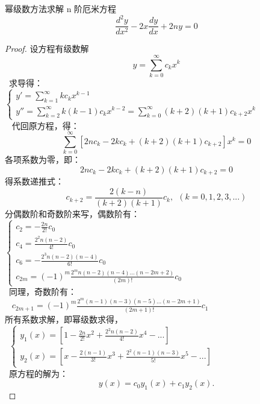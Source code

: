 \begin{example} %
	幂级数方法求解 n 阶厄米方程
	\begin{equation*}
		\frac{d^2 y}{d x^2} -2x \frac{d y}{d x} +2n y =0 
	\end{equation*}     
	
	\begin{proof} 
	设方程有级数解
		\begin{equation*}
		y=\sum_{k=0}^{\infty} c_k x^k
		\end{equation*}     
	 求导得：\\
	$\begin{cases}
	 y' = \sum_{k=1}^{\infty} k c_k x^{k-1} \\
	 y'' = \sum_{k=2}^{\infty} k (k-1) c_k x^{k-2} =  \sum_{k=0}^{\infty} (k+2) (k+1) c_{k+2} x^k
	 \end{cases}$ \\
    代回原方程，得：
   	\begin{equation*}
    \sum_{k=0}^{\infty} [ 2nc_k -2kc_k +(k+2)(k+1) c_{k+2}  ] x^k  =0
    \end{equation*}   
    各项系数为零，即： 
     \begin{equation*}
    2nc_k -2kc_k +(k+2)(k+1) c_{k+2} =0
    \end{equation*}   
    得系数递推式：
    \begin{equation*}
    c_{k+2} = \frac{ 2(k-n)}{(k+2)(k+1) } c_k, ~~  \left( k=0,1,2,3, ...  \right)
    \end{equation*}   
   分偶数阶和奇数阶来写，偶数阶有： \\
   	$\displaystyle \begin{cases}
    c_2 =- \frac{2n}{2!} c_0\\
    c_4 = \frac{2^2n(n-2)}{4!} c_0 \\
    c_6 = -\frac{2^3n(n-2)(n-4)}{6!} c_0 \\
    c_{2m} = (-1) ^m \frac{2^mn(n-2)(n-4) ... (n-2m+2)  } {(2m)!} c_0
   \end{cases}$ \\
   同理，奇数阶有：\\
   { $\displaystyle
    c_{2m+1} = (-1) ^m \frac{2^m (n-1) (n-3)(n-5)...(n-2m+1)  } {(2m+1)!} c_1$}\\
  所有系数求解，即幂级数求得，\\
    $\displaystyle \begin{cases}
 	y_1(x)  = [1- \frac{2n}{2!} x^2+ \frac{2^2n(n-2)}{4!} x^4 -...  ] \\
 	y_2(x)  = [x- \frac{2(n-1)}{3!} x^3+ \frac{2^2(n-1)(n-3) }{5!}x^5 -...  ]
   \end{cases}$ \\
    原方程的解为：
     \begin{equation*}
    y(x) =c_0y_1(x)+c_1 y_2(x).
    \end{equation*}   
	\end{proof}
\end{example}

